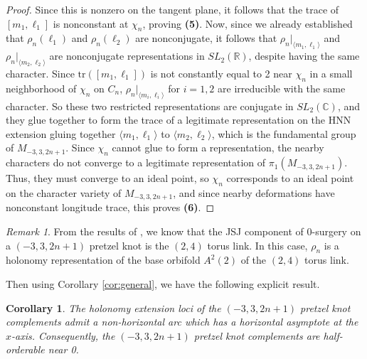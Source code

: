 \documentclass{article}
\theoremstyle{plain}
\theoremstyle{definition}
\theoremstyle{plain}
\theoremstyle{plain}
\newtheorem{corollary}[theorem]{Corollary}
\theoremstyle{plain}
\theoremstyle{remark}
\newtheorem{remark}[theorem]{Remark}
\theoremstyle{remark}
\theoremstyle{plain}
\theoremstyle{plain}
\begin{document}
\begin{proof}
Since this is nonzero on the tangent plane, it follows that the trace of $[m_1, \ell_1]$ is nonconstant at $\chi_n$, proving \textbf{(5)}. Now, since we already established that $\rho_n(\ell_1)$ and $\rho_n(\ell_2)$ are nonconjugate, it follows that $\rho_n|_{\langle m_1, \ell_1 \rangle}$ and $\rho_n|_{\langle m_2, \ell_2 \rangle}$ are nonconjugate representations in $SL_2(\mathbb{R})$, despite having the same character. Since $\text{tr}([m_1, \ell_1])$ is not constantly equal to 2 near $\chi_n$ in a small neighborhood of $\chi_n$ on $C_n$, $\rho_n|_{\langle m_i, \ell_i \rangle}$ for $i = 1, 2$ are irreducible with the same character. So these two restricted representations are conjugate in $SL_2(\mathbb{C})$, and they glue together to form the trace of a legitimate representation on the HNN extension gluing together $\langle m_1, \ell_1 \rangle$ to $\langle m_2, \ell_2 \rangle$, which is the fundamental group of $M_{-3, 3, 2n+1}$. Since $\chi_n$ cannot glue to form a representation, the nearby characters do not converge to a legitimate representation of $\pi_1(M_{-3, 3, 2n+1})$. Thus, they must converge to an ideal point, so $\chi_n$ corresponds to an ideal point on the character variety of $M_{-3, 3, 2n+1}$, and since nearby deformations have nonconstant longitude trace, this proves \textbf{(6)}. 
\end{proof}

\begin{remark}
From the results of \cite{sekino}, we know that the JSJ component of 0-surgery on a $(-3, 3, 2n+1)$ pretzel knot is the $(2, 4)$ torus link. In this case, $\rho_n$ is a holonomy representation of the base orbifold $A^2(2)$ of the $(2, 4)$ torus link. 
\end{remark}

Then using Corollary \ref{cor:general}, we have the following explicit result.

\begin{corollary}
The holonomy extension loci of the $(-3, 3, 2n+1)$ pretzel knot complements admit a non-horizontal arc which has a horizontal asymptote at the $x$-axis. Consequently, the $(-3, 3, 2n+1)$ pretzel knot complements are half-orderable near 0.
\end{corollary}
\end{document}
